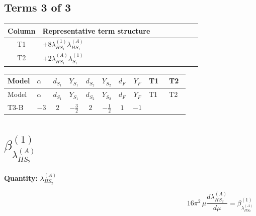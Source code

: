 \documentclass[8pt]{article}
\begin{document}
\begin{landscape}
\subsection*{Terms 3 of 3}
\begin{center}
\begin{tabular}{@{}c >{\raggedright\arraybackslash}p{0.82\linewidth}@{}}
\toprule
Column & Representative term structure \\
\midrule
T1 & \(\displaystyle +8 {\lambda_{HS_1}^{(1)}} {\lambda_{HS_1}^{(A)}}\) \\
\midrule
T2 & \(\displaystyle +2 {\lambda_{HS_1}^{(A)}} {\lambda_{S_1}^{(1)}}\) \\
\midrule
\bottomrule
\end{tabular}
\end{center}
\smallskip
\tiny
\begin{longtable}{@{}llcccccc >{\raggedright\arraybackslash}p{0.21\linewidth} >{\raggedright\arraybackslash}p{0.21\linewidth}@{}}
\toprule
Model & $\alpha$ & $d_{S_1}$ & $Y_{S_1}$ & $d_{S_2}$ & $Y_{S_2}$ & $d_F$ & $Y_F$ & T1 & T2 \\
\midrule
\endfirsthead
\toprule
Model & $\alpha$ & $d_{S_1}$ & $Y_{S_1}$ & $d_{S_2}$ & $Y_{S_2}$ & $d_F$ & $Y_F$ & T1 & T2 \\
\midrule
\endhead
T3-B & $-3$ & $2$ & $-\frac{3}{2}$ & $2$ & $-\frac{1}{2}$ & $1$ & $-1$ & \scriptsize\adjustbox{max width=\linewidth}{$\begin{gathered} +8 {\lambda_{HS_1}^{(1)}} {\lambda_{HS_1}^{(A)}}\end{gathered}$} & \scriptsize\adjustbox{max width=\linewidth}{$\begin{gathered} +2 {\lambda_{HS_1}^{(A)}} {\lambda_{S_1}^{(1)}}\end{gathered}$} \\
\midrule
\bottomrule
\end{longtable}
\clearpage
\section*{$\beta_{\lambda_{HS_2}^{(A)}}^{(1)}$}
\noindent\textbf{Quantity: }$\lambda_{HS_2}^{(A)}$\par\smallskip
\[16\pi^2\,\mu\frac{d \lambda_{HS_2}^{(A)}}{d\mu}=\beta_{\lambda_{HS_2}^{(A)}}^{(1)}\]

\end{landscape}
\end{document}
